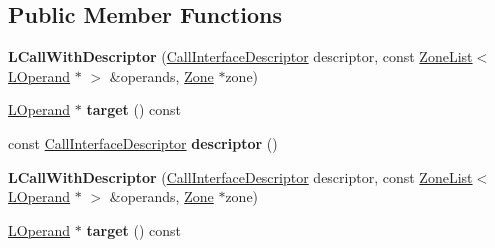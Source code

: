 \subsection*{Public Member Functions}
\begin{DoxyCompactItemize}
\item 
{\bfseries L\+Call\+With\+Descriptor} (\hyperlink{classv8_1_1internal_1_1_call_interface_descriptor}{Call\+Interface\+Descriptor} descriptor, const \hyperlink{classv8_1_1internal_1_1_zone_list}{Zone\+List}$<$ \hyperlink{classv8_1_1internal_1_1_l_operand}{L\+Operand} $\ast$ $>$ \&operands, \hyperlink{classv8_1_1internal_1_1_zone}{Zone} $\ast$zone)\hypertarget{classv8_1_1internal_1_1_l_call_with_descriptor_aef08b64c59fea5bdf7e3cc4e6ad17da5}{}\label{classv8_1_1internal_1_1_l_call_with_descriptor_aef08b64c59fea5bdf7e3cc4e6ad17da5}

\item 
\hyperlink{classv8_1_1internal_1_1_l_operand}{L\+Operand} $\ast$ {\bfseries target} () const \hypertarget{classv8_1_1internal_1_1_l_call_with_descriptor_a5f36cfb0ab3007ac639a4fa68b4b4162}{}\label{classv8_1_1internal_1_1_l_call_with_descriptor_a5f36cfb0ab3007ac639a4fa68b4b4162}

\item 
const \hyperlink{classv8_1_1internal_1_1_call_interface_descriptor}{Call\+Interface\+Descriptor} {\bfseries descriptor} ()\hypertarget{classv8_1_1internal_1_1_l_call_with_descriptor_ac81ca90af15fc24656387041c7893655}{}\label{classv8_1_1internal_1_1_l_call_with_descriptor_ac81ca90af15fc24656387041c7893655}

\item 
{\bfseries L\+Call\+With\+Descriptor} (\hyperlink{classv8_1_1internal_1_1_call_interface_descriptor}{Call\+Interface\+Descriptor} descriptor, const \hyperlink{classv8_1_1internal_1_1_zone_list}{Zone\+List}$<$ \hyperlink{classv8_1_1internal_1_1_l_operand}{L\+Operand} $\ast$ $>$ \&operands, \hyperlink{classv8_1_1internal_1_1_zone}{Zone} $\ast$zone)\hypertarget{classv8_1_1internal_1_1_l_call_with_descriptor_aef08b64c59fea5bdf7e3cc4e6ad17da5}{}\label{classv8_1_1internal_1_1_l_call_with_descriptor_aef08b64c59fea5bdf7e3cc4e6ad17da5}

\item 
\hyperlink{classv8_1_1internal_1_1_l_operand}{L\+Operand} $\ast$ {\bfseries target} () const \hypertarget{classv8_1_1internal_1_1_l_call_with_descriptor_a5f36cfb0ab3007ac639a4fa68b4b4162}{}\label{classv8_1_1internal_1_1_l_call_with_descriptor_a5f36cfb0ab3007ac639a4fa68b4b4162}


\end{DoxyCompactItemize}
